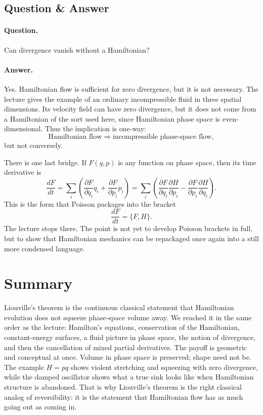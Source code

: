 \subsection{Question \& Answer}

\paragraph{Question.} Can divergence vanish without a Hamiltonian?

\paragraph{Answer.} Yes. Hamiltonian flow is sufficient for zero divergence, but it is not necessary. The lecture gives the example of an ordinary incompressible fluid in three spatial dimensions. Its velocity field can have zero divergence, but it does not come from a Hamiltonian of the sort used here, since Hamiltonian phase space is even-dimensional. Thus the implication is one-way:
\begin{equation}
\text{Hamiltonian flow} \Longrightarrow \text{incompressible phase-space flow},
\end{equation}
but not conversely.

There is one last bridge. If \(F(q,p)\) is any function on phase space, then its time derivative is
\begin{equation}
\frac{dF}{dt}
=
\sum_i\left(
\frac{\partial F}{\partial q_i}\dot q_i
+
\frac{\partial F}{\partial p_i}\dot p_i
\right)
=
\sum_i\left(
\frac{\partial F}{\partial q_i}\frac{\partial H}{\partial p_i}
-
\frac{\partial F}{\partial p_i}\frac{\partial H}{\partial q_i}
\right).
\end{equation}
This is the form that Poisson packages into the bracket
\begin{equation}
\frac{dF}{dt}=\{F,H\}.
\end{equation}
The lecture stops there. The point is not yet to develop Poisson brackets in full, but to show that Hamiltonian mechanics can be repackaged once again into a still more condensed language.

\section{Summary}

Liouville's theorem is the continuous classical statement that Hamiltonian evolution does not squeeze phase-space volume away. We reached it in the same order as the lecture: Hamilton's equations, conservation of the Hamiltonian, constant-energy surfaces, a fluid picture in phase space, the notion of divergence, and then the cancellation of mixed partial derivatives. The payoff is geometric and conceptual at once. Volume in phase space is preserved; shape need not be. The example \(H=pq\) shows violent stretching and squeezing with zero divergence, while the damped oscillator shows what a true sink looks like when Hamiltonian structure is abandoned. That is why Liouville's theorem is the right classical analog of reversibility: it is the statement that Hamiltonian flow has as much going out as coming in.